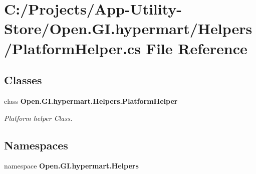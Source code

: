 \section{C\+:/\+Projects/\+App-\/\+Utility-\/\+Store/\+Open.G\+I.\+hypermart/\+Helpers/\+Platform\+Helper.cs File Reference}
\label{_platform_helper_8cs}
\subsection*{Classes}
\begin{DoxyCompactItemize}
\item 
class {\bfseries Open.\+G\+I.\+hypermart.\+Helpers.\+Platform\+Helper}
\begin{DoxyCompactList}\small\item\em Platform helper Class. \end{DoxyCompactList}\end{DoxyCompactItemize}
\subsection*{Namespaces}
\begin{DoxyCompactItemize}
\item 
namespace \textbf{ Open.\+G\+I.\+hypermart.\+Helpers}
\end{DoxyCompactItemize}
